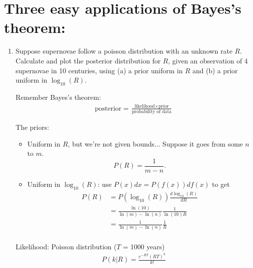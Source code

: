 \section{Three easy applications of Bayes's theorem:}

\begin{enumerate}[label=\textbf{\Alph*}.]
    \item Suppose supernovae follow a poisson distribution with an unknown rate $R$. Calculate and plot the posterior distribution for $R$, given an observation of 4 supernovae in 10 centuries, using (a) a prior uniform in $R$ and (b) a prior uniform in $\log_{10}(R)$.

    Remember Bayes's theorem:
    \begin{align*}
        \text{posterior} = \frac{\text{likelihood} \times \text{prior}}{\text{probability of data}}
    \end{align*}

    The priors: 
    \begin{itemize}
        \item Uniform in $R$, but we're not given bounds... Suppose it goes from some $n$ to $m$. $$P(R) = \frac{1}{m-n}.$$
        \item Uniform in $\log_{10}(R)$: use $P(x)dx = P(f(x))df(x)$ to get 
        \begin{align*}
            P(R) &= P(\log_{10}(R)) \frac{d\log_{10}(R)}{dR} \\
            &= \frac{\ln(10)}{\ln(m)-\ln(n)} \frac{1}{\ln(10)R} \\
            &= \frac{1}{\ln(m)-\ln(n)} \frac{1}{R} \\
        \end{align*}
    \end{itemize}

    Likelihood: Poisson distribution ($T$ = 1000 years)
    \begin{align*}
        P(k|R) = \frac{e^{-RT}(RT)^k}{k!}
    \end{align*}


\end{enumerate}
